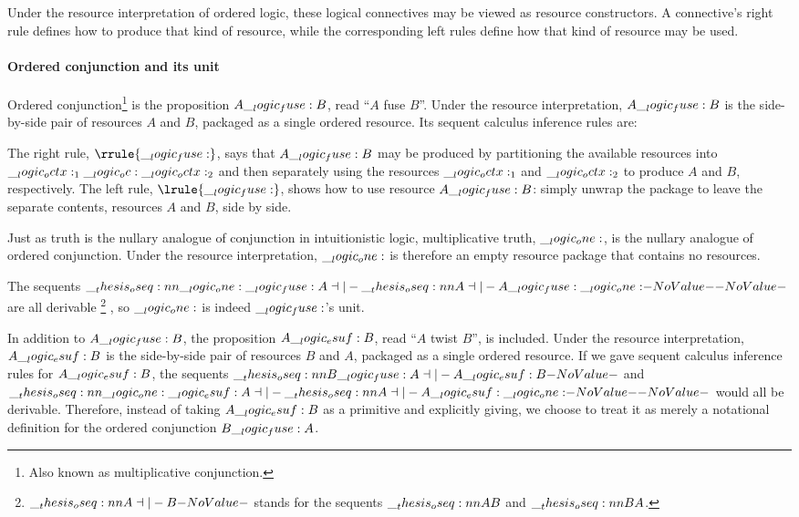 Under the resource interpretation of ordered logic, these logical connectives may be viewed as resource constructors.
A connective's right rule defines how to produce that kind of resource, while the corresponding left rules define how that kind of resource may be used.

\paragraph*{Ordered conjunction and its unit}\label{p:ordered-logic:ordered-conjunction}
Ordered conjunction\footnote{Also known as multiplicative conjunction.} is the proposition $A \__logic_fuse: B$, read \enquote{$A$ fuse $B$}.
Under the resource interpretation, $A \__logic_fuse: B$ is the side-by-side pair of resources $A$ and $B$, packaged as a single ordered resource.
Its sequent calculus inference rules are:
The right rule, $\rrule{\fuse}$, says that $A \__logic_fuse: B$ may be produced by partitioning the available resources into $\__logic_octx:_1 \__logic_oc: \__logic_octx:_2$ and then separately using the resources $\__logic_octx:_1$ and $\__logic_octx:_2$ to produce $A$ and $B$, respectively.
The left rule, $\lrule{\fuse}$, shows how to use resource $A \__logic_fuse: B$: simply unwrap the package to leave the separate contents, resources $A$ and $B$, side by side.

Just as truth is the nullary analogue of conjunction in intuitionistic logic, multiplicative truth, $\__logic_one:$, is the nullary analogue of ordered conjunction.
Under the resource interpretation, $\__logic_one:$ is therefore an empty resource package that contains no resources.
The sequents $\oseq{\one \fuse A \dashv|- \oseq{A \dashv|- A \fuse \one}}$ are all derivable%
\footnote{$\oseq{A \dashv|- B}$ stands for the sequents $\oseq{A |- B}$ and $\oseq{B |- A}$.}%
, so $\__logic_one:$ is indeed $\__logic_fuse:$'s unit.

In addition to $A \__logic_fuse: B$, the proposition $A \__logic_esuf: B$, read \enquote{$A$ twist $B$}, is included.
Under the resource interpretation, $A \__logic_esuf: B$ is the side-by-side pair of resources $B$ and $A$, packaged as a single ordered resource.
If we gave sequent calculus inference rules for $A \__logic_esuf: B$, the sequents $\oseq{B \fuse A \dashv|- A \esuf B}$ and $\oseq{\one \esuf A \dashv|- \oseq{A \dashv|- A \esuf \one}}$ would all be derivable.
Therefore, instead of taking $A \__logic_esuf: B$ as a primitive and explicitly giving, we choose to treat it as merely a notational definition for the ordered conjunction $B \__logic_fuse: A$.



